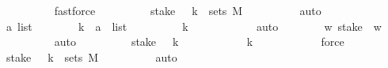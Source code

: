 \begin{isabellebody}
\ \ \ \ \ \ \ \ \isamarkupfalse%
\ fastforce\isanewline
\ \ \ \ \ \ \isamarkupfalse%
\ \isamarkupfalse%
\ {\isachardoublequoteopen}{\isacharparenleft}{\kern0pt}stake\ {}\ {\isacharminus}{\kern0pt}{\isacharbackquote}{\kern0pt}\ {\isacharbraceleft}{\kern0pt}k{\isacharbraceright}{\kern0pt}{\isacharparenright}{\kern0pt}\ {\isasymin}\ sets\ M{\isachardoublequoteclose}\isanewline
\ \ \ \ \ \ \ \ \isamarkupfalse%
\ auto\isanewline
\ \ \ \ \isamarkupfalse%
\ \isanewline
\ \ \ \ \ \ \isamarkupfalse%
\ a\ list\isanewline
\ \ \ \ \ \ \isamarkupfalse%
{\isachardoublequoteopen}\ k\ {\isacharequal}{\kern0pt}\ a\ {\isacharhash}{\kern0pt}\ list{\isachardoublequoteclose}\isanewline
\ \ \ \ \ \ \isamarkupfalse%
\ \isamarkupfalse%
\ {\isachardoublequoteopen}k\ {\isasymnoteq}\ {\isacharbrackleft}{\kern0pt}{\isacharbrackright}{\kern0pt}{\isachardoublequoteclose}\isanewline
\ \ \ \ \ \ \ \ \isamarkupfalse%
\ auto\isanewline
\ \ \ \ \ \ \isamarkupfalse%
\ {\isachardoublequoteopen}{\isasymforall}w{\isachardot}{\kern0pt}\ stake\ {}\ w\ {\isacharequal}{\kern0pt}\ {\isacharbrackleft}{\kern0pt}{\isacharbrackright}{\kern0pt}{\isachardoublequoteclose}\isanewline
\ \ \ \ \ \ \ \ \isamarkupfalse%
\ auto\isanewline
\ \ \ \ \ \ \isamarkupfalse%
\ \isamarkupfalse%
\ {\isachardoublequoteopen}{\isacharparenleft}{\kern0pt}stake\ {}\ {\isacharminus}{\kern0pt}{\isacharbackquote}{\kern0pt}\ {\isacharbraceleft}{\kern0pt}k{\isacharbraceright}{\kern0pt}{\isacharparenright}{\kern0pt}\ {\isacharequal}{\kern0pt}\ {\isacharbraceleft}{\kern0pt}{\isacharbraceright}{\kern0pt}{\isachardoublequoteclose}\isanewline
\ \ \ \ \ \ \ \ \isamarkupfalse%
\ {\isacartoucheopen}k\ {\isasymnoteq}\ {\isacharbrackleft}{\kern0pt}{\isacharbrackright}{\kern0pt}{\isacartoucheclose}\isanewline
\ \ \ \ \ \ \ \ \isamarkupfalse%
\ force\isanewline
\ \ \ \ \ \ \isamarkupfalse%
\ \isamarkupfalse%
\ {\isachardoublequoteopen}{\isacharparenleft}{\kern0pt}stake\ {}\ {\isacharminus}{\kern0pt}{\isacharbackquote}{\kern0pt}\ {\isacharbraceleft}{\kern0pt}k{\isacharbraceright}{\kern0pt}{\isacharparenright}{\kern0pt}\ {\isasymin}\ sets\ M{\isachardoublequoteclose}\isanewline
\ \ \ \ \ \ \ \ \isamarkupfalse%
\ auto\isanewline
\ \ \ \ \isamarkupfalse%
\isanewline
{}\isamarkupfalse%

\end{isabellebody}
